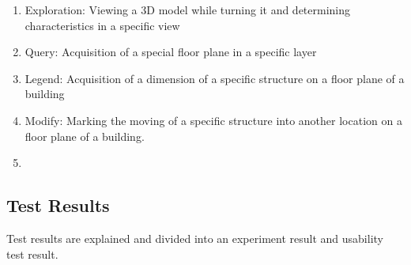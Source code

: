 

\begin{enumerate}
\item Exploration: Viewing a 3D model while turning it and determining characteristics in a specific view
\item Query: Acquisition of a special floor plane in a specific layer
\item Legend: Acquisition of a dimension of a specific structure on a floor plane of a building
\item Modify: Marking the moving of a specific structure into another location on a floor plane of a building.
\item {}
\end{enumerate}



\subsection{Test Results}

Test results are explained and divided into an experiment result and usability test result.

